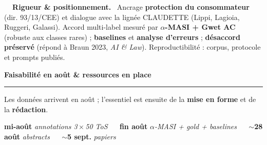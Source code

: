 \documentclass[fontsize=9pt,a4paper]{scrartcl}
\newcommand{\heading}[2]{%
  \par\vspace{7pt}%
  {\sffamily\bfseries\color{navy}\small #1\hspace{0.5em}#2}\par\vspace{1pt}%
  {\color{gold}\rule{\linewidth}{1pt}}\par\vspace{4pt}}
\begin{document}
\vspace{5pt}
\begin{tcolorbox}[enhanced,colback=surface,colframe=line,boxrule=0.5pt,arc=2pt,
  left=8pt,right=8pt,top=5pt,bottom=5pt]
  {\sffamily\bfseries\color{navy}\footnotesize\faBalanceScale~~Rigueur \& positionnement.}~
  {\small Ancrage \textbf{protection du consommateur} (dir. 93/13/CEE) et dialogue avec la lignée
  CLAUDETTE (Lippi, Lagioia, Ruggeri, Galassi). Accord multi-label mesuré par \textbf{$\alpha$-MASI +
  Gwet AC} (robuste aux classes rares) ; \textbf{baselines} et \textbf{analyse d'erreurs} ; \textbf{désaccord
  préservé} (répond à Braun 2023, \emph{AI \& Law}). Reproductibilité : corpus, protocole et prompts
  publiés.}
\end{tcolorbox}

\heading{\faClock}{Faisabilité en août \& ressources en place}

{\small Les données arrivent en août ; l'essentiel est ensuite de la \textbf{mise en forme} et de la
\textbf{rédaction}.}\par\vspace{4pt}

{\centering\small
\textbf{mi-août} \emph{annotations 3\,$\times$\,50 ToS}
~\textcolor{gold}{\faLongArrowAltRight}~ \textbf{fin août} \emph{$\alpha$-MASI + gold + baselines}
~\textcolor{gold}{\faLongArrowAltRight}~ \textbf{$\sim$28 août} \emph{abstracts}
~\textcolor{gold}{\faLongArrowAltRight}~ \textbf{$\sim$5 sept.} \emph{papiers}\par}
\vspace{4pt}
\end{document}
